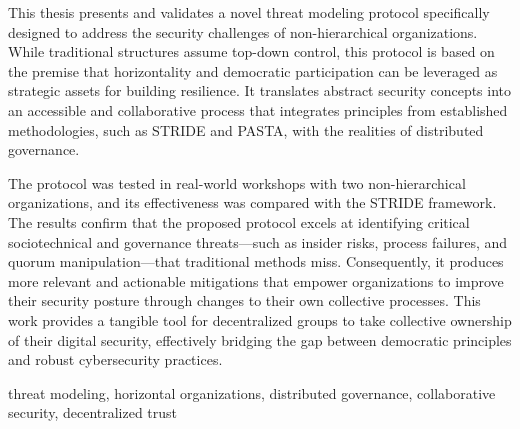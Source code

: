 
%

This thesis presents and validates a novel threat modeling protocol specifically
designed to address the security challenges of non-hierarchical organizations.
While traditional structures assume top-down control, this protocol is based on
the premise that horizontality and democratic participation can be leveraged as
strategic assets for building resilience. It translates abstract security
concepts into an accessible and collaborative process that integrates principles
from established methodologies, such as STRIDE and PASTA, with the realities of
distributed governance.

The protocol was tested in real-world workshops with two non-hierarchical
organizations, and its effectiveness was compared with the STRIDE framework. The
results confirm that the proposed protocol excels at identifying critical
sociotechnical and governance threats—such as insider risks, process failures,
and quorum manipulation—that traditional methods miss. Consequently, it produces
more relevant and actionable mitigations that empower organizations to improve
their security posture through changes to their own collective processes. This
work provides a tangible tool for decentralized groups to take collective
ownership of their digital security, effectively bridging the gap between
democratic principles and robust cybersecurity practices.

\begin{keywords}
  threat modeling, horizontal organizations, distributed governance, collaborative security, decentralized trust
\end{keywords}
  